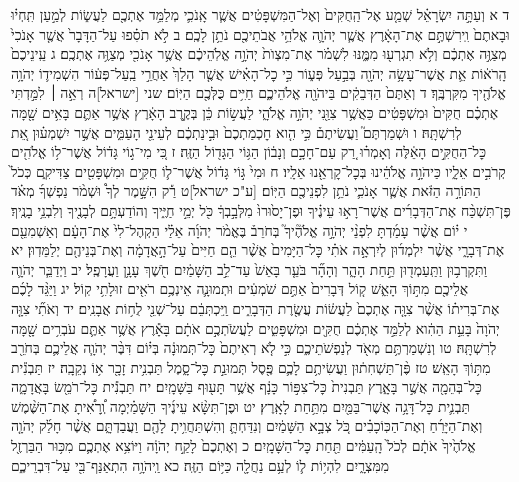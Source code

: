 \documentclass[twoside, openany, parskip=half, 11pt]{book}
\begin{document}
ד א וְעַתָּ֣ה יִשְׂרָאֵ֗ל שְׁמַ֤ע אֶל־הַֽחֻקִּים֙ וְאֶל־הַמִּשְׁפָּטִ֔ים אֲשֶׁ֧ר אָֽנֹכִ֛י מְלַמֵּ֥ד אֶתְכֶ֖ם לַעֲשׂ֑וֹת לְמַ֣עַן תִּֽחְי֗וּ וּבָאתֶם֙ וִֽירִשְׁתֶּ֣ם אֶת־הָאָ֔רֶץ אֲשֶׁ֧ר יְהֹוָ֛ה אֱלֹהֵ֥י אֲבֹתֵיכֶ֖ם נֹתֵ֥ן לָכֶֽם׃ ב לֹ֣א תֹסִ֗פוּ עַל־הַדָּבָר֙ אֲשֶׁ֤ר אָנֹכִי֙ מְצַוֶּ֣ה אֶתְכֶ֔ם וְלֹ֥א תִגְרְע֖וּ מִמֶּ֑נּוּ לִשְׁמֹ֗ר אֶת־מִצְוֺת֙ יְהֹוָ֣ה אֱלֹֽהֵיכֶ֔ם אֲשֶׁ֥ר אָנֹכִ֖י מְצַוֶּ֥ה אֶתְכֶֽם׃ ג עֵֽינֵיכֶם֙ הָֽרֹא֔וֹת אֵ֛ת אֲשֶׁר־עָשָׂ֥ה יְהֹוָ֖ה בְּבַ֣עַל פְּע֑וֹר כִּ֣י כׇל־הָאִ֗ישׁ אֲשֶׁ֤ר הָלַךְ֙ אַחֲרֵ֣י בַֽעַל־פְּע֔וֹר הִשְׁמִיד֛וֹ יְהֹוָ֥ה אֱלֹהֶ֖יךָ מִקִּרְבֶּֽךָ׃ ד וְאַתֶּם֙ הַדְּבֵקִ֔ים בַּיהֹוָ֖ה אֱלֹהֵיכֶ֑ם חַיִּ֥ים כֻּלְּכֶ֖ם הַיּֽוֹם׃ שני [ישראל]ה רְאֵ֣ה ׀ לִמַּ֣דְתִּי אֶתְכֶ֗ם חֻקִּים֙ וּמִשְׁפָּטִ֔ים כַּאֲשֶׁ֥ר צִוַּ֖נִי יְהֹוָ֣ה אֱלֹהָ֑י לַעֲשׂ֣וֹת כֵּ֔ן בְּקֶ֣רֶב הָאָ֔רֶץ אֲשֶׁ֥ר אַתֶּ֛ם בָּאִ֥ים שָׁ֖מָּה לְרִשְׁתָּֽהּ׃ ו וּשְׁמַרְתֶּם֮ וַעֲשִׂיתֶם֒ כִּ֣י הִ֤וא חׇכְמַתְכֶם֙ וּבִ֣ינַתְכֶ֔ם לְעֵינֵ֖י הָעַמִּ֑ים אֲשֶׁ֣ר יִשְׁמְע֗וּן אֵ֚ת כׇּל־הַחֻקִּ֣ים הָאֵ֔לֶּה וְאָמְר֗וּ רַ֚ק עַם־חָכָ֣ם וְנָב֔וֹן הַגּ֥וֹי הַגָּד֖וֹל הַזֶּֽה׃ ז כִּ֚י מִי־ג֣וֹי גָּד֔וֹל אֲשֶׁר־ל֥וֹ אֱלֹהִ֖ים קְרֹבִ֣ים אֵלָ֑יו כַּיהֹוָ֣ה אֱלֹהֵ֔ינוּ בְּכׇל־קׇרְאֵ֖נוּ אֵלָֽיו׃ ח וּמִי֙ גּ֣וֹי גָּד֔וֹל אֲשֶׁר־ל֛וֹ חֻקִּ֥ים וּמִשְׁפָּטִ֖ים צַדִּיקִ֑ם כְּכֹל֙ הַתּוֹרָ֣ה הַזֹּ֔את אֲשֶׁ֧ר אָנֹכִ֛י נֹתֵ֥ן לִפְנֵיכֶ֖ם הַיּֽוֹם׃ [ע"כ ישראל]ט רַ֡ק הִשָּׁ֣מֶר לְךָ֩ וּשְׁמֹ֨ר נַפְשְׁךָ֜ מְאֹ֗ד פֶּן־תִּשְׁכַּ֨ח אֶת־הַדְּבָרִ֜ים אֲשֶׁר־רָא֣וּ עֵינֶ֗יךָ וּפֶן־יָס֙וּרוּ֙ מִלְּבָ֣בְךָ֔ כֹּ֖ל יְמֵ֣י חַיֶּ֑יךָ וְהוֹדַעְתָּ֥ם לְבָנֶ֖יךָ וְלִבְנֵ֥י בָנֶֽיךָ׃ י י֗וֹם אֲשֶׁ֨ר עָמַ֜דְתָּ לִפְנֵ֨י יְהֹוָ֣ה אֱלֹהֶ֘יךָ֮ בְּחֹרֵב֒ בֶּאֱמֹ֨ר יְהֹוָ֜ה אֵלַ֗י הַקְהֶל־לִי֙ אֶת־הָעָ֔ם וְאַשְׁמִעֵ֖ם אֶת־דְּבָרָ֑י אֲשֶׁ֨ר יִלְמְד֜וּן לְיִרְאָ֣ה אֹתִ֗י כׇּל־הַיָּמִים֙ אֲשֶׁ֨ר הֵ֤ם חַיִּים֙ עַל־הָ֣אֲדָמָ֔ה וְאֶת־בְּנֵיהֶ֖ם יְלַמֵּדֽוּן׃ יא וַתִּקְרְב֥וּן וַתַּֽעַמְד֖וּן תַּ֣חַת הָהָ֑ר וְהָהָ֞ר בֹּעֵ֤ר בָּאֵשׁ֙ עַד־לֵ֣ב הַשָּׁמַ֔יִם חֹ֖שֶׁךְ עָנָ֥ן וַעֲרָפֶֽל׃ יב וַיְדַבֵּ֧ר יְהֹוָ֛ה אֲלֵיכֶ֖ם מִתּ֣וֹךְ הָאֵ֑שׁ ק֤וֹל דְּבָרִים֙ אַתֶּ֣ם שֹׁמְעִ֔ים וּתְמוּנָ֛ה אֵינְכֶ֥ם רֹאִ֖ים זוּלָתִ֥י קֽוֹל׃ יג וַיַּגֵּ֨ד לָכֶ֜ם אֶת־בְּרִית֗וֹ אֲשֶׁ֨ר צִוָּ֤ה אֶתְכֶם֙ לַעֲשׂ֔וֹת עֲשֶׂ֖רֶת הַדְּבָרִ֑ים וַֽיִּכְתְּבֵ֔ם עַל־שְׁנֵ֖י לֻח֥וֹת אֲבָנִֽים׃ יד וְאֹתִ֞י צִוָּ֤ה יְהֹוָה֙ בָּעֵ֣ת הַהִ֔וא לְלַמֵּ֣ד אֶתְכֶ֔ם חֻקִּ֖ים וּמִשְׁפָּטִ֑ים לַעֲשֹׂתְכֶ֣ם אֹתָ֔ם בָּאָ֕רֶץ אֲשֶׁ֥ר אַתֶּ֛ם עֹבְרִ֥ים שָׁ֖מָּה לְרִשְׁתָּֽהּ׃ טו וְנִשְׁמַרְתֶּ֥ם מְאֹ֖ד לְנַפְשֹׁתֵיכֶ֑ם כִּ֣י לֹ֤א רְאִיתֶם֙ כׇּל־תְּמוּנָ֔ה בְּי֗וֹם דִּבֶּ֨ר יְהֹוָ֧ה אֲלֵיכֶ֛ם בְּחֹרֵ֖ב מִתּ֥וֹךְ הָאֵֽשׁ׃ טז פֶּ֨ן־תַּשְׁחִת֔וּן וַעֲשִׂיתֶ֥ם לָכֶ֛ם פֶּ֖סֶל תְּמוּנַ֣ת כׇּל־סָ֑מֶל תַּבְנִ֥ית זָכָ֖ר א֥וֹ נְקֵבָֽה׃ יז תַּבְנִ֕ית כׇּל־בְּהֵמָ֖ה אֲשֶׁ֣ר בָּאָ֑רֶץ תַּבְנִית֙ כׇּל־צִפּ֣וֹר כָּנָ֔ף אֲשֶׁ֥ר תָּע֖וּף בַּשָּׁמָֽיִם׃ יח תַּבְנִ֕ית כׇּל־רֹמֵ֖שׂ בָּאֲדָמָ֑ה תַּבְנִ֛ית כׇּל־דָּגָ֥ה אֲשֶׁר־בַּמַּ֖יִם מִתַּ֥חַת לָאָֽרֶץ׃ יט וּפֶן־תִּשָּׂ֨א עֵינֶ֜יךָ הַשָּׁמַ֗יְמָה וְֽ֠רָאִ֠יתָ אֶת־הַשֶּׁ֨מֶשׁ וְאֶת־הַיָּרֵ֜חַ וְאֶת־הַכּֽוֹכָבִ֗ים כֹּ֚ל צְבָ֣א הַשָּׁמַ֔יִם וְנִדַּחְתָּ֛ וְהִשְׁתַּחֲוִ֥יתָ לָהֶ֖ם וַעֲבַדְתָּ֑ם אֲשֶׁ֨ר חָלַ֜ק יְהֹוָ֤ה אֱלֹהֶ֙יךָ֙ אֹתָ֔ם לְכֹל֙ הָֽעַמִּ֔ים תַּ֖חַת כׇּל־הַשָּׁמָֽיִם׃ כ וְאֶתְכֶם֙ לָקַ֣ח יְהֹוָ֔ה וַיּוֹצִ֥א אֶתְכֶ֛ם מִכּ֥וּר הַבַּרְזֶ֖ל מִמִּצְרָ֑יִם לִהְי֥וֹת ל֛וֹ לְעַ֥ם נַחֲלָ֖ה כַּיּ֥וֹם הַזֶּֽה׃ כא וַֽיהֹוָ֥ה הִתְאַנַּף־בִּ֖י עַל־דִּבְרֵיכֶ֑ם 
\end{document}
